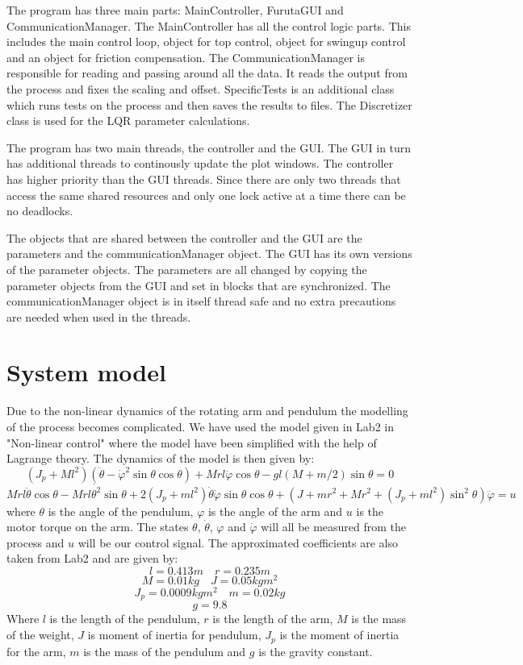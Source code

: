 \documentclass[10pt,a4paper]{article}
\begin{document}

The program has three main parts: MainController, FurutaGUI and CommunicationManager. The MainController has all the control logic parts. This includes the main control loop, object for top control, object for swingup control and an object for friction compensation. The CommunicationManager is responsible for reading and passing around all the data. It reads the output from the process and fixes the scaling and offset. SpecificTests is an additional class which runs tests on the process and then saves the results to files. The Discretizer class is used for the LQR parameter calculations.

The program has two main threads, the controller and the GUI. The GUI in turn has additional threads to continously update the plot windows. The controller has higher priority than the GUI threads. Since there are only two threads that access the same shared resources and only one lock active at a time there can be no deadlocks.

The objects that are shared between the controller and the GUI are the parameters and the communicationManager object. The GUI has its own versions of the parameter objects. The parameters are all changed by copying the parameter objects from the GUI and set in blocks that are synchronized. The communicationManager object is in itself thread safe and no extra precautions are needed when used in the threads.


\section{System model}
Due to the non-linear dynamics of the rotating arm and pendulum the modelling of the process becomes complicated. We have used the model given in Lab2 in "Non-linear control" where the model have been simplified with the help of Lagrange theory. The dynamics of the model is then given by:
$$(J_p + Ml^2)(\ddot{\theta} - \dot{\varphi} ^2\sin\theta \cos\theta )+Mrl\ddot{\varphi}\cos\theta-gl(M+m/2)\sin\theta = 0 $$
\begin{equation}
Mrl\ddot{\theta}\cos\theta - Mrl\dot{\theta ^2}\sin\theta + 2(J_p + ml^2 ) \dot{\theta} \dot{\varphi}\sin\theta \cos\theta + (J+mr^2 + Mr^2 + (J_p+ml^2)\sin^2\theta)\ddot{\varphi}=u
\label{eq:model}
\end{equation}
where $\theta$ is the angle of the pendulum, $\varphi$ is the angle of the arm and $u$ is the motor torque on the arm. The states $\theta$, $\dot{\theta}$, $\varphi$ and $\dot{\varphi}$ will all be measured from the process and $u$ will be our control signal. The approximated coefficients are also taken from Lab2 and are given by:
$$l=0.413m \quad  r=0.235m$$
$$M=0.01kg \quad J=0.05kgm^2$$
$$J_p=0.0009kgm^2 \quad m=0.02kg$$
$$ g=9.8$$
Where $l$ is the length of the pendulum, $r$ is the length of the arm, $M$ is the mass of the weight, $J$ is moment of inertia  for pendulum, $J_p$ is the moment of inertia for the arm, $m$ is the mass of the pendulum and $g$ is the gravity constant.
\end{document}
